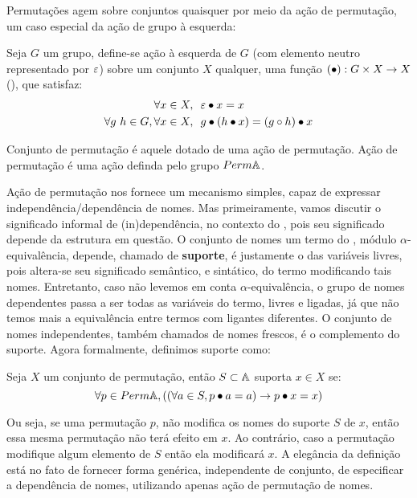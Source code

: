 Permutações agem sobre conjuntos quaisquer por meio da ação de permutação, um caso especial da ação de grupo à esquerda:
\begin{definicao}
	Seja $G$ um grupo, define-se ação à esquerda de $G$ (com elemento neutro representado por $\varepsilon$) sobre um conjunto $X$ qualquer, uma função $(\bullet) : G \times X \rightarrow X$ (), que satisfaz:
	\begin{align}
		\forall x \in X,&~~ \varepsilon \bullet x = x \label{eq:act-neutral}\\
		\forall g~h \in G, \forall x \in X,&~~ g \bullet (h \bullet x) = (g \circ h) \bullet x \label{eq:act-compat}
	\end{align}
\end{definicao}\noindent
\begin{definicao}
	Conjunto de permutação é aquele dotado de uma ação de permutação. Ação de permutação é uma ação definda pelo grupo $Perm \mathbb{A}$.
\end{definicao}\noindent
{} Ação de permutação nos fornece um mecanismo simples, capaz de expressar independência/dependência de nomes. Mas primeiramente, vamos discutir o significado informal de (in)dependência, no contexto do \lcalc, pois seu significado depende da estrutura em questão. O conjunto de nomes um termo do \lcalc, módulo $\alpha$-equivalência, depende, chamado de \textbf{suporte}, é justamente o das variáveis livres, pois altera-se seu significado semântico, e sintático, do termo modificando tais nomes. Entretanto, caso não levemos em conta $\alpha$-equivalência, o grupo de nomes dependentes passa a ser todas as variáveis do termo, livres e ligadas, já que não temos mais a equivalência entre termos com ligantes diferentes. O conjunto de nomes independentes, também chamados de nomes frescos, é o complemento do suporte. Agora formalmente, definimos suporte como:
\begin{definicao}[Suporte]
	Seja $X$ um conjunto de permutação, então $S \subset \mathbb{A}$ suporta $x \in X$ se:
	\begin{equation}\label{eq:suporte}
		\forall p \in Perm \mathbb{A}, ((\forall a \in S, p \bullet a = a) \rightarrow p \bullet x = x)
	\end{equation}
\end{definicao}\noindent
Ou seja, se uma permutação $p$, não modifica os nomes do suporte $S$ de $x$, então essa mesma permutação não terá efeito em $x$. Ao contrário, caso a permutação modifique algum elemento de $S$ então ela modificará $x$. A elegância da definição está no fato de fornecer forma genérica, independente de conjunto, de especificar a dependência de nomes, utilizando apenas ação de permutação de nomes. 

